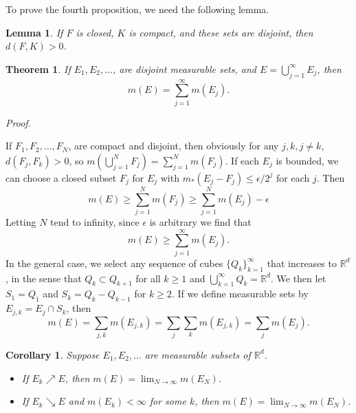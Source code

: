 \documentclass[
]{book}
\providecommand{\tightlist}{%
  \setlength{\itemsep}{0pt}\setlength{\parskip}{0pt}}
\newtheorem{theorem}{Theorem}[chapter]
\newtheorem{lemma}{Lemma}[chapter]
\newtheorem{corollary}{Corollary}[chapter]
\theoremstyle{definition}
\theoremstyle{definition}
\theoremstyle{definition}
\theoremstyle{definition}
\theoremstyle{remark}
\begin{document}
To prove the fourth proposition, we need the following lemma.

\begin{lemma}
If \(F\) is closed, \(K\) is compact, and these sets are disjoint, then \(d(F,K)>0\).
\end{lemma}

\begin{theorem}
If \(E_1,E_2,\dots\), are disjoint measurable sets, and \(E=\bigcup_{j=1}^{\infty}E_j\), then
\[
m(E)=\sum_{j=1}^{\infty}m(E_j).
\]
\end{theorem}

\emph{Proof.}

If \(F_1,F_2,\dots, F_N\), are compact and disjoint, then obviously for any \(j,k,j\ne k\), \(d(F_j,F_k)>0\), so \(m\left(\bigcup_{j=1}^NF_j\right)=\sum_{j=1}^Nm(F_j)\). If each \(E_j\) is bounded, we can choose a closed subset \(F_j\) for \(E_j\) with \(m_{\ast}(E_j-F_j)\leq \epsilon/2^j\) for each \(j\). Then
\[
  m(E) \geq \sum_{j=1}^Nm(F_j) \ge \sum_{j=1}^Nm(E_j)-\epsilon
  \]
Letting \(N\) tend to infinity, since \(\epsilon\) is arbitrary we find that
\[
  m(E)\ge\sum_{j=1}^{\infty}m(E_j).
  \]
In the general case, we select any sequence of cubes \(\{Q_k\}_{k=1}^{\infty}\) that increases to \(\mathbb{R}^d\), in the sense that \(Q_k\subset Q_{k+1}\) for all \(k\ge 1\) and \(\bigcup_{k=1}^{\infty}Q_k=\mathbb{R}^d\). We then let \(S_1=Q_1\) and \(S_k=Q_k-Q_{k-1}\) for \(k\ge 2\). If we define measurable sets by \(E_{j,k}=E_j\cap S_k\), then
\[
  m(E) =\sum_{j,k}m(E_{j,k})=\sum_j\sum_km(E_{j,k})=\sum_jm(E_j).
  \]

\begin{corollary}

Suppose \(E_1,E_2,...\) are measurable subsets of \(\mathbb{R}^d\).

\begin{itemize}
\tightlist
\item
  If \(E_k \nearrow E\), then \(m(E) =\lim_{N\to \infty}m(E_N)\).
\item
  If \(E_k \searrow E\) and \(m(E_k)<\infty\) for some \(k\), then \(m(E) =\lim_{N\to \infty}m(E_N)\).
\end{itemize}

\end{corollary}
\end{document}
